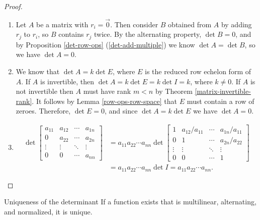 \begin{proof}\proofbreak
    \begin{enumerate}[label=(\arabic*)]
        \item Let $A$ be a matrix with $r_i = \vec{0}$. Then consider $B$ obtained from $A$ by adding $r_j$ to $r_i$, so $B$ contains $r_j$ twice. By the alternating property, $\det B = 0$, and by Proposition \ref{det-row-ops} (\ref{det-add-multiple}) we know $\det A = \det B$, so we have $\det A = 0$.
        \item We know that $\det A = k\det E$, where $E$ is the reduced row echelon form of $A$. If $A$ is invertible, then $\det A = k\det E = k\det I = k$, where $k \neq 0$. If $A$ is not invertible then $A$ must have rank $m < n$ by Theorem \ref{matrix-invertible-rank}. It follows by Lemma \ref{row-ops-row-space} that $E$ must contain a row of zeroes. Therefore, $\det E = 0$, and since $\det A = k\det E$ we have $\det A = 0$.
        \item \begin{align*}
            \det\begin{bmatrix}
                a_{11} & a_{12} & \cdots & a_{1n} \\
                0 & a_{22} & \cdots & a_{2n} \\
                \vdots & \vdots & \ddots & \vdots \\
                0 & 0 & \cdots & a_{nn}
            \end{bmatrix} &= a_{11}a_{22}\cdots a_{nn}\det\begin{bmatrix}
                1 & a_{12}/a_{11} & \cdots & a_{1n}/a_{11} \\
                0 & 1 & \cdots & a_{2n}/{a_22} \\
                \vdots & \vdots & \ddots & \vdots \\
                0 & 0 & \cdots & 1
            \end{bmatrix} \\
            &= a_{11}a_{22}\cdots a_{nn}\det I = a_{11}a_{22}\cdots a_{nn}.
        \end{align*}
    \end{enumerate}
\end{proof}

\begin{thm}Uniqueness of the determinant\label{determinant-uniqueness}\proofbreak
    If a function exists that is multilinear, alternating, and normalized, it is unique.
\end{thm}

